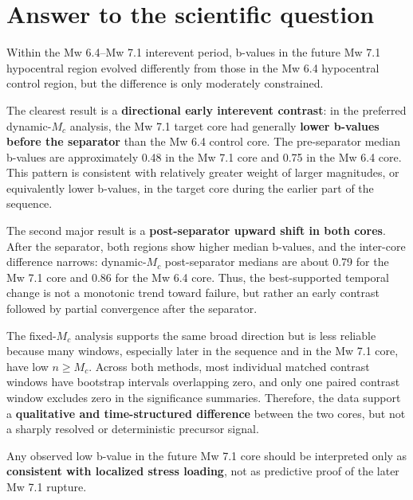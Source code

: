 \documentclass[11pt]{article}
\begin{document}
\section{Answer to the scientific question}
Within the Mw 6.4--Mw 7.1 interevent period, b-values in the future Mw 7.1 hypocentral region evolved differently from those in the Mw 6.4 hypocentral control region, but the difference is only moderately constrained.

The clearest result is a \textbf{directional early interevent contrast}: in the preferred dynamic-$M_c$ analysis, the Mw 7.1 target core had generally \textbf{lower b-values before the separator} than the Mw 6.4 control core. The pre-separator median b-values are approximately 0.48 in the Mw 7.1 core and 0.75 in the Mw 6.4 core. This pattern is consistent with relatively greater weight of larger magnitudes, or equivalently lower b-values, in the target core during the earlier part of the sequence.

The second major result is a \textbf{post-separator upward shift in both cores}. After the separator, both regions show higher median b-values, and the inter-core difference narrows: dynamic-$M_c$ post-separator medians are about 0.79 for the Mw 7.1 core and 0.86 for the Mw 6.4 core. Thus, the best-supported temporal change is not a monotonic trend toward failure, but rather an early contrast followed by partial convergence after the separator.

The fixed-$M_c$ analysis supports the same broad direction but is less reliable because many windows, especially later in the sequence and in the Mw 7.1 core, have low $n\geq M_c$. Across both methods, most individual matched contrast windows have bootstrap intervals overlapping zero, and only one paired contrast window excludes zero in the significance summaries. Therefore, the data support a \textbf{qualitative and time-structured difference} between the two cores, but not a sharply resolved or deterministic precursor signal.

Any observed low b-value in the future Mw 7.1 core should be interpreted only as \textbf{consistent with localized stress loading}, not as predictive proof of the later Mw 7.1 rupture.
\end{document}
